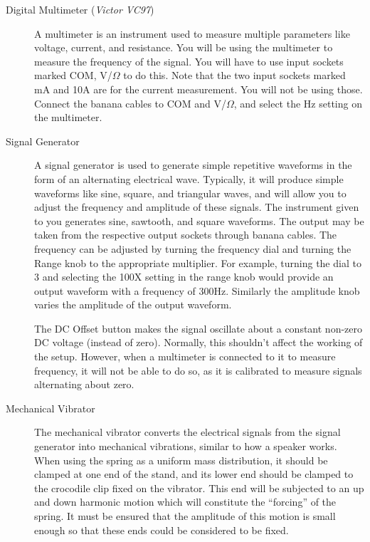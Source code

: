 \begin{description}

\item[Digital Multimeter (\textit{Victor VC97})]

A multimeter is an instrument used to measure multiple parameters like voltage, current, and resistance. You will be using the multimeter to measure the frequency of the signal. You will have to use input sockets marked COM, V/$\Omega$ to do this. Note that the two input sockets marked mA and 10A are for the current measurement. You will not be using those. Connect the banana cables to COM and V/$\Omega$, and select the Hz setting on the multimeter. 

\item[Signal Generator]

A signal generator is used to generate simple repetitive waveforms in the form of an alternating electrical wave. Typically, it will produce simple waveforms like sine, square, and triangular waves, and will allow you to adjust the frequency and amplitude of these signals. The instrument given to you generates sine, sawtooth, and square waveforms. The output may be taken from the respective output sockets through banana cables. The frequency can be adjusted by turning the frequency dial and turning the Range knob to the appropriate multiplier. For example, turning the dial to 3 and selecting the 100X setting in the range knob would provide an output waveform with a frequency of 300Hz. Similarly the amplitude knob varies the amplitude of the output waveform.

\begin{tip}
The DC Offset button makes the signal oscillate about a constant non-zero DC voltage (instead of zero). Normally, this shouldn't affect the working of the setup. However, when a multimeter is connected to it to measure frequency, it will not be able to do so, as it is calibrated to measure signals alternating about zero.
\end{tip}

\item[Mechanical Vibrator]

The mechanical vibrator converts the electrical signals from the signal generator into mechanical vibrations, similar to how a speaker works. When using the spring as a uniform mass distribution, it should be clamped at one end of the stand, and its lower end should be clamped to the crocodile clip fixed on the vibrator. This end will be subjected to an up and down harmonic motion which will constitute the ``forcing'' of the spring. It must be ensured that the amplitude of this motion is small enough so that these ends could be considered to be fixed.



\end{description}
